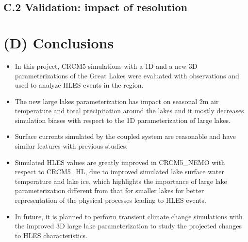 \documentclass[a0b,landscape]{a0poster}
\begin{document}
\begin{multicols*}{4}
\subsection*{C.2 Validation: impact of resolution}



{
  \color{SaddleBrown} %

  \section*{(D) Conclusions}

  \begin{itemize}
  \item In this project, CRCM5 simulations with a 1D and a new 3D parameterizations of the Great Lakes were evaluated with observations and used to analyze HLES events in the region.
  \item The new large lakes parameterization has impact on seasonal 2m air temperature and total precipitation
        around the lakes and it mostly decreases simulation biases with respect to the
        1D parameterization of large lakes.
  \item Surface currents simulated by the coupled system are reasonable and have similar features with previous studies.
  \item Simulated HLES values are greatly improved in CRCM5\_NEMO with respect to
        CRCM5\_HL, due to improved simulated lake surface water temperature and lake
        ice, which highlights the importance of large lake parameterization different
        from that for smaller lakes for better representation of the physical processes
        leading to HLES events.
  \item In future, it is planned to perform transient climate change simulations with
        the improved 3D large lake parameterization to study the projected changes to
        HLES characteristics.
  \end{itemize}
}


\end{multicols*}
\end{document}
